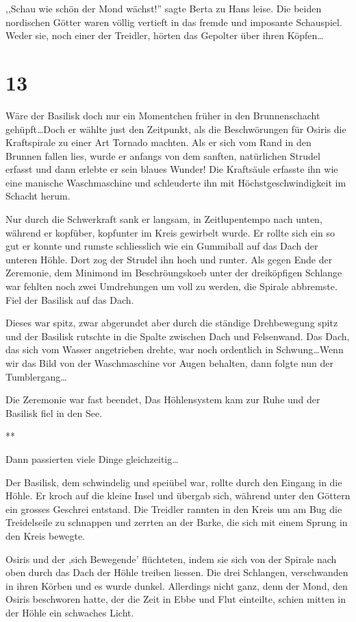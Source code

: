 \documentclass[11pt,titlepage,a5paper]{book}
\newcommand{\sterne}{\par{\centering ***\par}}
\begin{document}
,,Schau wie schön der Mond wächst!'' sagte Berta zu Hans leise. Die beiden nordischen Götter waren völlig vertieft in das fremde und imposante Schauspiel. Weder sie, noch einer der Treidler, hörten das Gepolter über ihren Köpfen\dots

\section*{13}

Wäre der Basilisk doch nur ein Momentchen früher in den Brunnenschacht gehüpft\dots Doch er wählte just den Zeitpunkt, als die Beschwörungen für Osiris die Kraftspirale zu einer Art Tornado machten. Als er sich vom Rand in den Brunnen fallen lies, wurde er anfangs von dem sanften, natürlichen Strudel erfasst und dann erlebte er sein blaues Wunder! Die Kraftsäule erfasste ihn wie eine manische Waschmaschine und schleuderte ihn mit Höchstgeschwindigkeit im Schacht herum. 

Nur durch die Schwerkraft sank er langsam, in Zeitlupentempo nach unten, während er kopfüber, kopfunter im Kreis gewirbelt wurde. Er rollte sich ein so gut er konnte und rumste schliesslich wie ein Gummiball auf das Dach der unteren Höhle. Dort zog der Strudel ihn hoch und runter. Als gegen Ende der Zeremonie, dem Minimond im Beschröungskoeb unter der dreiköpfigen Schlange war fehlten noch zwei Umdrehungen um voll zu werden, die Spirale abbremste. Fiel der Basilisk auf das Dach.

Dieses war spitz, zwar abgerundet aber durch die ständige Drehbewegung spitz und der Basilisk rutschte in die Spalte zwischen Dach und Felsenwand. Das Dach, das sich vom Wasser angetrieben drehte, war noch ordentlich in Schwung\dots Wenn wir das Bild von der Waschmaschine vor Augen behalten, dann folgte nun der Tumblergang\dots

Die Zeremonie war fast beendet, Das Höhlensystem kam zur Ruhe und der Basilisk fiel in den See.

\sterne

Dann passierten viele Dinge gleichzeitig\dots

Der Basilisk, dem schwindelig und speiübel war, rollte durch den Eingang in die Höhle. Er kroch auf die kleine Insel und übergab sich, während unter den Göttern ein grosses Geschrei entstand. Die Treidler rannten in den Kreis um am Bug die Treidelseile zu schnappen und zerrten an der Barke, die sich mit einem Sprung in den Kreis bewegte. 

Osiris und der ,sich Bewegende' flüchteten, indem sie sich von der Spirale nach oben durch das Dach der Höhle treiben liessen. Die drei Schlangen, verschwanden in ihren Körben und es wurde dunkel. Allerdings nicht ganz, denn der Mond, den Osiris beschworen hatte, der die Zeit in Ebbe und Flut einteilte, schien mitten in der Höhle ein schwaches Licht.
\end{document}
